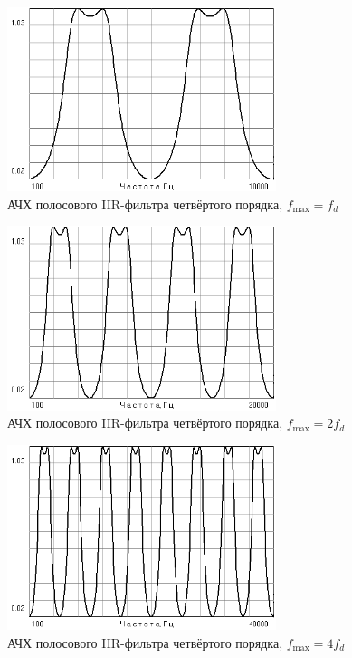 \documentclass[a4paper,14pt]{extarticle}
\begin{document}
\begin{figure}[H]
  \centering
  \includegraphics[width=0.7\textwidth]{Z1_PPF/gain_IIR_4p_1fd.png}
  \caption{АЧХ полосового IIR-фильтра четвёртого порядка, $f_{\max}=f_d$}
  \label{fig:}
\end{figure}
\begin{figure}[H]
  \centering
  \includegraphics[width=0.7\textwidth]{Z1_PPF/gain_IIR_4p_2fd.png}
  \caption{АЧХ полосового IIR-фильтра четвёртого порядка, $f_{\max}=2f_d$}
  \label{fig:}
\end{figure}
\begin{figure}[H]
  \centering
  \includegraphics[width=0.7\textwidth]{Z1_PPF/gain_IIR_4p_4fd.png}
  \caption{АЧХ полосового IIR-фильтра четвёртого порядка, $f_{\max}=4f_d$}
  \label{fig:}
\end{figure}
\end{document}

